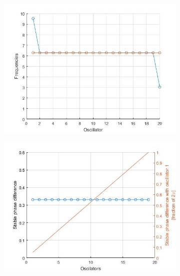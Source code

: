 \documentclass[a4paper]{scrartcl}
\begin{document}
\begin{figure}[h]
	\centering
	\begin{subfigure}[b]{0.49\textwidth}
		\centering
		\includegraphics[width=\textwidth]{results/6.b/compSP_DP_CPFreq.jpg}
		\caption{}\label{3a}
	\end{subfigure}
	\centering
	\begin{subfigure}[b]{0.49\textwidth}
		\centering
		\includegraphics[width=\textwidth]{results/6.b/compSP_DP_CPPhase.jpg}
		\caption{}\label{3b}
	\end{subfigure}
	\centering
	\begin{subfigure}[b]{0.49\textwidth}
		\centering

\end{subfigure}
\end{figure}
\end{document}
